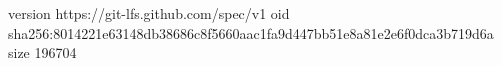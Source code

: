 version https://git-lfs.github.com/spec/v1
oid sha256:8014221e63148db38686c8f5660aac1fa9d447bb51e8a81e2e6f0dca3b719d6a
size 196704
